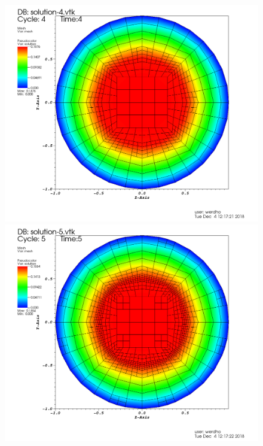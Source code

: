 \documentclass[11pt,fullpage]{article}
\theoremstyle{lemma}
\theoremstyle{definition}
\theoremstyle{lemma}
\begin{document}
\begin{figure}[!ht]
	\begin{minipage}{.45\paperwidth}
		\centering
		\includegraphics[scale=.12]{Step6-5.png}
	\end{minipage}%
	\begin{minipage}{.4\paperwidth}
		\centering
		\includegraphics[scale=.12]{Step6-6.png}
	\end{minipage}
	\begin{minipage}{.45\paperwidth}

\end{minipage}
\end{figure}
\end{document}

